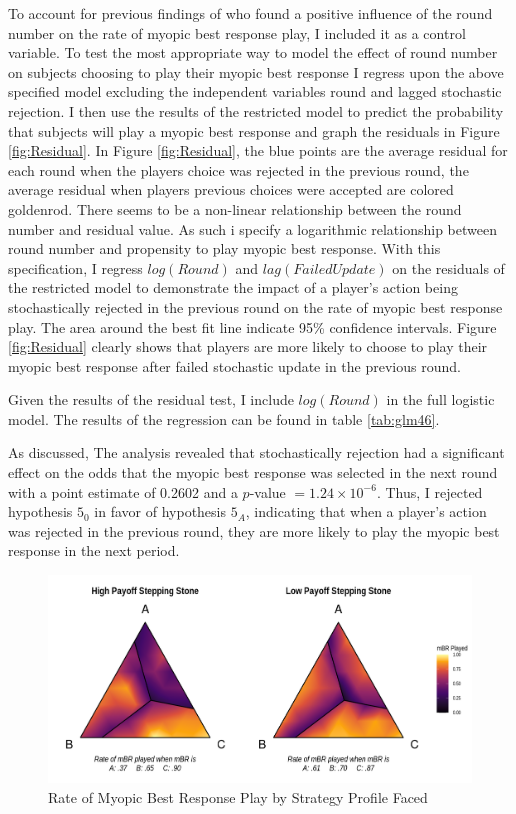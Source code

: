 To account for previous findings of \cite{lim2016experimental} who found a positive influence of the round number on the rate of myopic best response play, I included it as a control variable. To test the most appropriate way to model the effect of round number on subjects choosing to play their myopic best response I regress upon the above specified model excluding the independent variables round and lagged stochastic rejection. I then use the results of the restricted model to predict the probability that subjects will play a myopic best response and graph the residuals in Figure \ref{fig:Residual}. In Figure \ref{fig:Residual}, the blue points are the average residual for each round when the players choice was rejected in the previous round, the average residual when players\textquotesingle{} previous choices were accepted are colored goldenrod. There seems to be a non-linear relationship between the round number and residual value. As such i specify a logarithmic relationship between round number and propensity to play myopic best response. With this specification, I regress $log(Round)$ and $lag(Failed Update)$ on the residuals of the restricted model to demonstrate the impact of a player's action being stochastically rejected in the previous round on the rate of myopic best response play. The area around the best fit line indicate 95\% confidence intervals. Figure \ref{fig:Residual} clearly shows that players are more likely to choose to play their myopic best response after failed stochastic update in the previous round.

Given the results of the residual test, I include $log(Round)$ in the full logistic model. The results of the regression can be found in table \ref{tab:glm46}. 

As discussed, The analysis revealed that stochastically rejection had a significant effect on the odds that the myopic best response was selected in the next round with a point estimate of 0.2602 and a $p$-value $= 1.24 \times 10^{-6}$. Thus, I rejected hypothesis $5_0$ in favor of hypothesis $5_A$, indicating that when a player's action was rejected in the previous round, they are more likely to play the myopic best response in the next period.

\begin{figure}[h]
\captionsetup{justification=centering}
  \caption[caption]{Rate of Myopic Best Response Play by Strategy Profile Faced}
   \label{fig:Games23MBRPlot}
    \includegraphics[width = \textwidth]{Images/Games23MBRPlot.png}
\end{figure}

